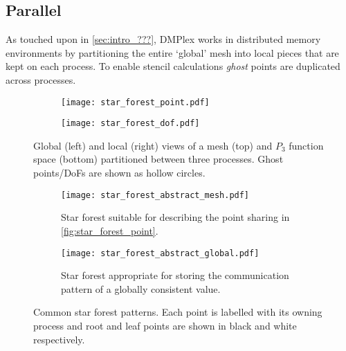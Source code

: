 \documentclass[thesis]{subfiles}
\begin{document}
\subsection{Parallel}
\label{sec:dmplex_parallel}

As touched upon in \cref{sec:intro_???}, DMPlex works in distributed memory environments by partitioning the entire `global' mesh into local pieces that are kept on each process.
To enable stencil calculations \emph{ghost} points are duplicated across processes.

\begin{figure}
  \centering

  \begin{subfigure}{\textwidth}
    \centering
    \texttt{[image: star\_forest\_point.pdf]}
  \end{subfigure}

  \begin{subfigure}{\textwidth}
    \centering
    \texttt{[image: star\_forest\_dof.pdf]}
  \end{subfigure}

  \caption{
    Global (left) and local (right) views of a mesh (top) and $P_3$ function space (bottom) partitioned between three processes.
    Ghost points/DoFs are shown as hollow circles.
  }
  \label{fig:star_forest}
\end{figure}


\begin{figure}
  \centering
  \begin{subfigure}{.6\textwidth}
    \centering
    \texttt{[image: star\_forest\_abstract\_mesh.pdf]}
    \caption{Star forest suitable for describing the point sharing in \cref{fig:star_forest_point}.}
  \end{subfigure}
  \begin{subfigure}{.39\textwidth}
    \centering
    \texttt{[image: star\_forest\_abstract\_global.pdf]}
    \caption{Star forest appropriate for storing the communication pattern of a globally consistent value.}
  \end{subfigure}
  \caption{
    Common star forest patterns.
    Each point is labelled with its owning process and root and leaf points are shown in black and white respectively.
  }
  \label{fig:star_forest_abstract}
\end{figure}

\end{document}
